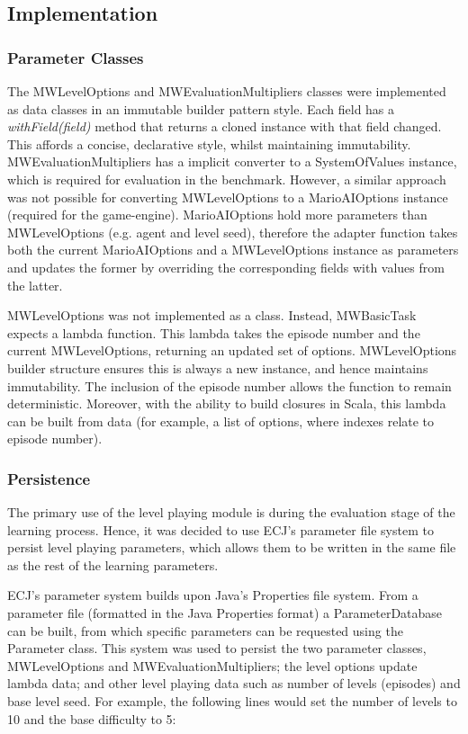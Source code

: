 \subsection{Implementation}

\subsubsection{Parameter Classes}
\label{subsec:paramclasses}

The MWLevelOptions and MWEvaluationMultipliers classes were implemented as data classes in an immutable builder pattern style. Each field has a \emph{withField(field)} method that returns a cloned instance with that field changed. This affords a concise, declarative style, whilst maintaining immutability. MWEvaluationMultipliers has a implicit converter to a SystemOfValues instance, which is required for evaluation in the benchmark. However, a similar approach was not possible for converting MWLevelOptions to a MarioAIOptions instance (required for the game-engine). MarioAIOptions hold more parameters than MWLevelOptions (e.g. agent and level seed), therefore the adapter function takes both the current MarioAIOptions and a MWLevelOptions instance as parameters and updates the former by overriding the corresponding fields with values from the latter.

MWLevelOptions was not implemented as a class. Instead, MWBasicTask expects a lambda function. This lambda takes the episode number and the current MWLevelOptions, returning an updated set of options. MWLevelOptions builder structure ensures this is always a new instance, and hence maintains immutability. The inclusion of the episode number allows the function to remain deterministic. Moreover, with the ability to build closures in Scala, this lambda can be built from data (for example, a list of options, where indexes relate to episode number).

\subsubsection{Persistence}
\label{subsec:evalparams}

The primary use of the level playing module is during the evaluation stage of the learning process. Hence, it was decided to use ECJ's parameter file system to persist level playing parameters, which allows them to be written in the same file as the rest of the learning parameters.

ECJ's parameter system builds upon Java's Properties file system. From a parameter file (formatted in the Java Properties format) a ParameterDatabase can be built, from which specific parameters can be requested using the Parameter class. This system was used to persist the two parameter classes, MWLevelOptions and MWEvaluationMultipliers; the level options update lambda data; and other level playing data such as number of levels (episodes) and base level seed. For example, the following lines would set the number of levels to 10 and the base difficulty to 5:

